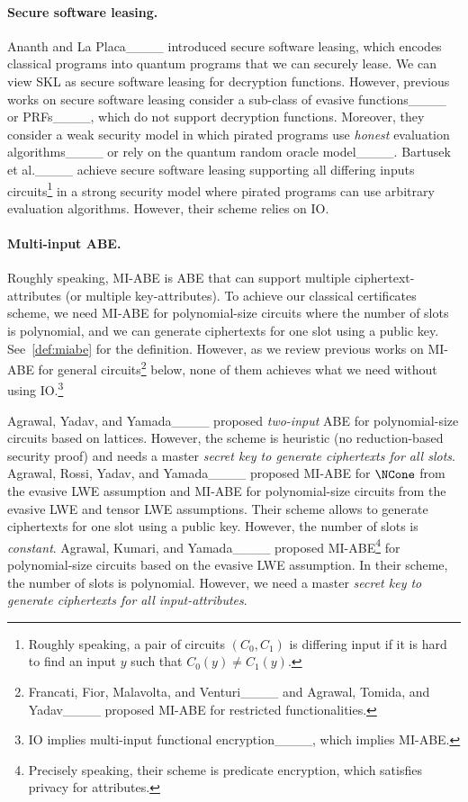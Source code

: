 \paragraph{Secure software leasing.}
Ananth and La Placa____ introduced secure software
leasing, which encodes classical programs into quantum programs that
we can securely lease. We can view SKL as secure software leasing for
decryption functions. However, previous works on secure software
leasing consider a sub-class of evasive
functions____
or PRFs____, which do not support decryption
functions. Moreover, they consider a weak security model in which
pirated programs use \emph{honest} evaluation
algorithms____ or rely on the
quantum random oracle model____. Bartusek et
al.____ achieve secure software leasing supporting all
differing inputs circuits\footnote{Roughly speaking, a pair of
circuits $(C_0,C_1)$ is differing input if it is hard to find an input
$y$ such that $C_0(y)\ne C_1(y)$.} in a strong security model where
pirated programs can use arbitrary evaluation algorithms. However, their scheme relies on IO.



\paragraph{Multi-input ABE.}
Roughly speaking, MI-ABE is ABE that can support multiple ciphertext-attributes (or multiple key-attributes).
To achieve our classical certificates scheme, we need MI-ABE for polynomial-size circuits where the number of slots is polynomial, and we can generate ciphertexts for one slot using a public key. See~\cref{def:miabe} for the definition.
However, as we review previous works on MI-ABE for general circuits\footnote{Francati, Fior, Malavolta, and Venturi____ and Agrawal, Tomida, and Yadav____ proposed MI-ABE for restricted functionalities.} below, none of them achieves what we need without using IO.\footnote{IO implies multi-input functional encryption____, which implies MI-ABE.}

Agrawal, Yadav, and Yamada____ proposed \emph{two-input} ABE for polynomial-size circuits based on lattices. However, the scheme is heuristic (no reduction-based security proof) and needs a master \emph{secret key to generate ciphertexts for all slots}.
Agrawal, Rossi, Yadav, and Yamada____ proposed MI-ABE for
$\NCone$ from the evasive LWE assumption and MI-ABE for
polynomial-size circuits from the evasive LWE and tensor LWE
assumptions. Their scheme allows to generate ciphertexts for one slot using a public key. However, the number of slots is \emph{constant}.
Agrawal, Kumari, and Yamada____ proposed MI-ABE\footnote{Precisely speaking, their scheme is predicate encryption, which satisfies privacy for attributes.} for polynomial-size circuits based on the evasive LWE assumption.
In their scheme, the number of slots is polynomial. However, we need a master \emph{secret key to generate ciphertexts for all input-attributes}.

